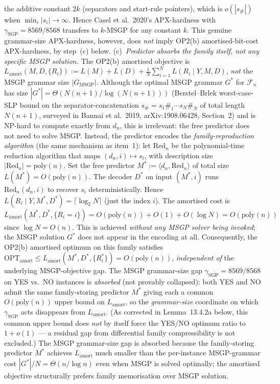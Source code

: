 \documentclass[
]{article}
\begin{document}
\begin{enumerate}
the additive constant $2k$ (separators and start-rule pointers),
which is $o(|s_\#|)$ when $\min_i |s_i| \to \infty$. Hence
Casel et al.\ 2020's APX-hardness with $\gamma_{\mathrm{SGP}} =
8569/8568$ transfers to $k$-MSGP for any constant $k$. This
genuine grammar-size APX-hardness, however, does \emph{not}
imply OP2(b) amortised-bit-cost APX-hardness, by step~(c) below.
(c)~\emph{Predictor absorbs the family itself, not any specific
MSGP solution.} The OP2(b) amortised objective is
$L_{\mathrm{amort}}(M,D,\{R_i\}) := L(M) + L(D) + \frac{1}{N}
\sum_{i=1}^{N} L(R_i \mid Y,M,D)$, \emph{not} the MSGP grammar
size $|G_{\mathrm{MSGP}}|$. Although the optimal MSGP grammar
$G^*$ for $\mathcal{F}_n$ has size $|G^*| = \Theta(N(n+1) /
\log(N(n+1)))$ (Berstel--Brlek worst-case-SLP bound on the
separator-concatenation $s_\# = s_1 \#_1 \cdots s_N \#_N$ of
total length $N(n+1)$, surveyed in Bannai et al.\ 2019,
arXiv:1908.06428, Section~2) and is NP-hard to compute exactly
from $d_n$, this is irrelevant: the free predictor does not
need to solve MSGP. Instead, the predictor encodes the
\emph{family-reproduction algorithm} (the same mechanism as
item~1): let $\mathrm{Red}_n$ be the polynomial-time reduction
algorithm that maps $(d_n, i) \mapsto s_i$, with description
size $|\mathrm{Red}_n| = \mathrm{poly}(n)$. Set the free
predictor $M^* := \langle d_n, \mathrm{Red}_n \rangle$ of
total size $L(M^*) = O(\mathrm{poly}(n))$. The decoder $D^*$
on input $(M^*, i)$ runs $\mathrm{Red}_n(d_n, i)$ to recover
$s_i$ deterministically. Hence $L(R_i \mid Y, M^*, D^*) =
\lceil \log_2 N \rceil$ (just the index $i$). The amortised
cost is $L_{\mathrm{amort}}(M^*, D^*, \{R_i = i\}) =
O(\mathrm{poly}(n)) + O(1) + O(\log N) = O(\mathrm{poly}(n))$
since $\log N = O(n)$. This is achieved \emph{without any MSGP
solver being invoked}; the MSGP solution $G^*$ does not appear
in the encoding at all. Consequently, the OP2(b) amortised
optimum on this family satisfies $\mathrm{OPT}_{\mathrm{amort}}
\leq L_{\mathrm{amort}}(M^*, D^*, \{R_i^*\}) =
O(\mathrm{poly}(n))$, \emph{independent of} the underlying
MSGP-objective gap. The MSGP grammar-size gap
$\gamma_{\mathrm{SGP}} = 8569/8568$ on YES vs.\ NO instances
is \emph{absorbed} (not provably collapsed): both YES and NO
admit the same family-storing predictor $M^*$ giving each a
common $O(\mathrm{poly}(n))$ upper bound on $L_{\mathrm{amort}}$,
so the \emph{grammar-size} coordinate on which
$\gamma_{\mathrm{SGP}}$ acts disappears from $L_{\mathrm{amort}}$.
(As corrected in Lemma~13.4.2a below, this common upper bound does
\emph{not} by itself force the YES/NO optimum ratio to $1+o(1)$ ---
a residual gap from differential family compressibility is not
excluded.) The MSGP grammar-size gap is absorbed because the
family-storing predictor $M^*$ achieves $L_{\mathrm{amort}}$
much smaller than the
per-instance MSGP-grammar cost $|G^*|/N = \Theta(n/\log n)$
even when MSGP is solved optimally; the amortised objective
structurally prefers family memorisation over MSGP solution.


\end{enumerate}
\end{document}
